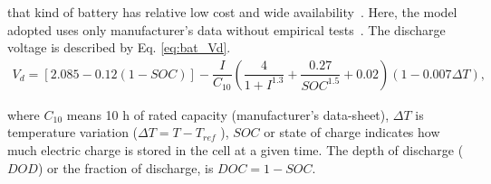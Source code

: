 %
%
%
%
that kind of battery has relative low cost and wide availability~\cite{Copetti}. 
%
Here, the model adopted uses only manufacturer's data without empirical tests~\cite{Copetti}. %
%
The discharge voltage is described by Eq. \eqref{eq:bat_Vd}.
%
\begin{multline}
\label{eq:bat_Vd}
V_{d} = \left[ 2.085-0.12(1-SOC) \right] - \dfrac{I}{C_{10}} \left( \dfrac{4}{1+I^{1.3}} + \dfrac{0.27}{SOC^{1.5}}+0.02 \right) (1-0.007 \Delta T),
\end{multline}

\noindent where $C_{10}$ means 10 h of rated capacity (manufacturer's data-sheet), $\Delta T$ is temperature variation ($\Delta T=T-T_{ref} $%
), $ SOC $ or state of charge indicates how much electric charge is stored in the cell at a given time. %
%
%
The depth of discharge ($DOD$) or the fraction of discharge, is $DOC=1-SOC$.

